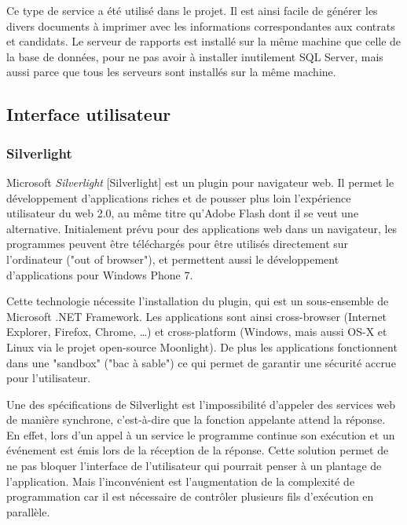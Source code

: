 Ce type de service a été utilisé dans le projet.
Il est ainsi facile de générer les divers documents à imprimer avec les informations correspondantes aux contrats et candidats.
Le serveur de rapports est installé sur la même machine que celle de la base de données, pour ne pas avoir à installer inutilement SQL Server, mais aussi parce que tous les serveurs sont installés sur la même machine.


\subsection{Interface utilisateur}


\subsubsection{Silverlight}
\label{Silverlight}


Microsoft \textit{Silverlight} [Silverlight] est un plugin pour navigateur web.
Il permet le développement d'applications riches et de pousser plus loin l'expérience utilisateur du web 2.0, au même titre qu'Adobe Flash dont il se veut une alternative.
Initialement prévu pour des applications web dans un navigateur, les programmes peuvent être téléchargés pour être utilisés directement sur l'ordinateur ("out of browser"), et permettent aussi le développement d'applications pour Windows Phone 7.

Cette technologie nécessite l'installation du plugin, qui est un sous-ensemble de Microsoft .NET Framework.
Les applications sont ainsi cross-browser (Internet Explorer, Firefox, Chrome, \ldots) et cross-platform (Windows, mais aussi OS-X et Linux via le projet open-source Moonlight).
De plus les applications fonctionnent dans une "sandbox" ("bac à sable") ce qui permet de garantir une sécurité accrue pour l'utilisateur.

Une des spécifications de Silverlight est l'impossibilité d'appeler des services web de manière synchrone, c'est-à-dire que la fonction appelante attend la réponse.
En effet, lors d'un appel à un service le programme continue son exécution et un événement est émis lors de la réception de la réponse.
Cette solution permet de ne pas bloquer l'interface de l'utilisateur qui pourrait penser à un plantage de l'application.
Mais l'inconvénient est l'augmentation de la complexité de programmation car il est nécessaire de contrôler plusieurs fils d'exécution en parallèle.


